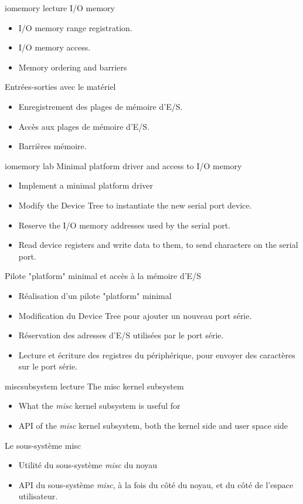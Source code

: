 {iomemory}
{lecture}
{I/O memory}
{
  \begin{itemize}
  \item I/O memory range registration.
  \item I/O memory access.
  \item Memory ordering and barriers
  \end{itemize}
}
{Entrées-sorties avec le matériel}
{
  \begin{itemize}
  \item Enregistrement des plages de mémoire d'E/S.
  \item Accès aux plages de mémoire d'E/S.
  \item Barrières mémoire.
  \end{itemize}
}
{iomemory}
{lab}
{Minimal platform driver and access to I/O memory}
{
  \begin{itemize}
  \item Implement a minimal platform driver
  \item Modify the Device Tree to instantiate the new serial port
    device.
  \item Reserve the I/O memory addresses used by the serial port.
  \item Read device registers and write data to them, to send
    characters on the serial port.
  \end{itemize}
}
{Pilote "platform" minimal et accès à la mémoire d'E/S}
{
  \begin{itemize}
  \item Réalisation d'un pilote "platform" minimal
  \item Modification du Device Tree pour ajouter un nouveau
    port série.
  \item Réservation des adresses d'E/S utilisées par le port série.
  \item Lecture et écriture des registres du périphérique, pour
    envoyer des caractères sur le port série.
  \end{itemize}
}
{miscsubsystem}
{lecture}
{The misc kernel subsystem}
{
  \begin{itemize}
  \item What the {\em misc} kernel subsystem is useful for
  \item API of the {\em misc} kernel subsystem, both the kernel side
    and user space side
  \end{itemize}
}
{Le sous-système misc}
{
  \begin{itemize}
  \item Utilité du sous-système {\em misc} du noyau
  \item API du sous-système {\em misc}, à la fois du côté du noyau, et
    du côté de l'espace utilisateur.
  \end{itemize}
}
